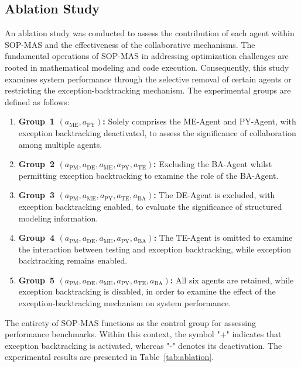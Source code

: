 \documentclass[preprint,12pt]{elsarticle}
\begin{document}
\subsection{Ablation Study}
An ablation study was conducted to assess the contribution of each agent within SOP-MAS and the effectiveness of the collaborative mechanisms. The fundamental operations of SOP-MAS in addressing optimization challenges are rooted in mathematical modeling and code execution. Consequently, this study examines system performance through the selective removal of certain agents or restricting the exception-backtracking mechanism. The experimental groups are defined as follows:

\begin{enumerate}[label=\arabic*)]
    \item \textbf{Group~1 $(a_\text{ME}, a_\text{PY})$:} Solely comprises the ME-Agent and PY-Agent, with exception backtracking deactivated, to assess the significance of collaboration among multiple agents.

    \item \textbf{Group~2 $(a_\text{PM}, a_\text{DE}, a_\text{ME}, a_\text{PY}, a_\text{TE})$:} Excluding the BA-Agent whilst permitting exception backtracking to examine the role of the BA-Agent.

    \item \textbf{Group~3 $(a_\text{PM}, a_\text{ME}, a_\text{PY}, a_\text{TE}, a_\text{BA})$:} The DE-Agent is excluded, with exception backtracking enabled, to evaluate the significance of structured modeling information.

    \item \textbf{Group~4 $(a_\text{PM}, a_\text{DE}, a_\text{ME}, a_\text{PY}, a_\text{BA})$:} The TE-Agent is omitted to examine the interaction between testing and exception backtracking, while exception backtracking remains enabled.

    \item \textbf{Group~5 $(a_\text{PM}, a_\text{DE}, a_\text{ME}, a_\text{PY}, a_\text{TE}, a_\text{BA})$:} All six agents are retained, while exception backtracking is disabled, in order to examine the effect of the exception-backtracking mechanism on system performance.
\end{enumerate}
The entirety of SOP-MAS functions as the control group for assessing performance benchmarks. Within this context, the symbol "+" indicates that exception backtracking is activated, whereas "-" denotes its deactivation. The experimental results are presented in Table~\ref{tab:ablation}.
\end{document}
